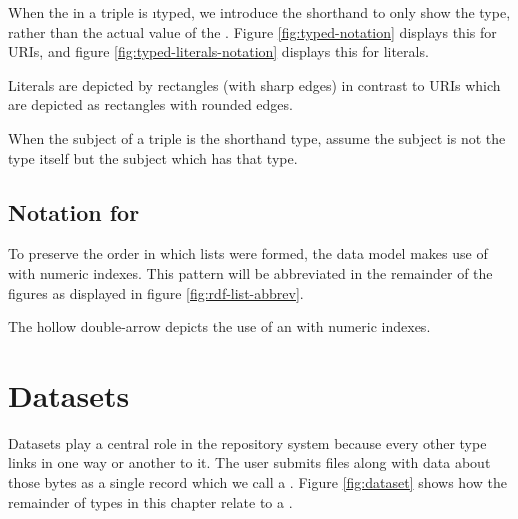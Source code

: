   When the  in a triple is \i{typed}, we introduce the shorthand
  to only show the type, rather than the actual value of the .
  Figure \ref{fig:typed-notation} displays this for URIs, and figure
  \ref{fig:typed-literals-notation} displays this for literals.


  Literals are depicted by rectangles (with sharp edges) in contrast to URIs
  which are depicted as rectangles with rounded edges.


  When the subject of a triple is the shorthand type, assume the subject is not
  the type itself but the subject which has that type.

\subsection{Notation for }

  To preserve the order in which lists were formed, the data model makes use
  of  with numeric indexes.  This pattern will be abbreviated
  in the remainder of the figures as displayed in figure
  \ref{fig:rdf-list-abbrev}.


  The hollow double-arrow depicts the use of an  with numeric
  indexes.

\section{Datasets}

  Datasets play a central role in the repository system because every
  other type links in one way or another to it.  The user submits
  files along with data about those bytes as a single record which we
  call a .  Figure \ref{fig:dataset} shows how the
  remainder of types in this chapter relate to a .


